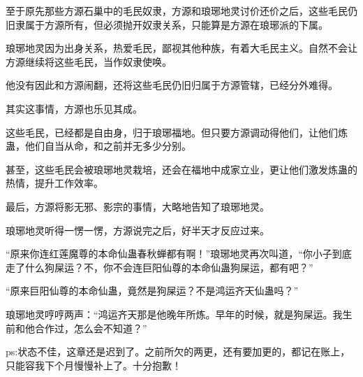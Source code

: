 \begin{this_body}
至于原先那些方源石巢中的毛民奴隶，方源和琅琊地灵讨价还价之后，这些毛民仍旧隶属于方源所有，但必须抛开奴隶关系，只能算是方源在琅琊派的下属。

琅琊地灵因为出身关系，热爱毛民，鄙视其他种族，有着大毛民主义。自然不会让方源继续将这些毛民，当作奴隶使唤。

他没有因此和方源闹翻，还将这些毛民仍旧归属于方源管辖，已经分外难得。

其实这事情，方源也乐见其成。

这些毛民，已经都是自由身，归于琅琊福地。但只要方源调动得他们，让他们炼蛊，他们自当从命，和之前并无多少分别。

甚至，这些毛民会被琅琊地灵栽培，还会在福地中成家立业，更让他们激发炼蛊的热情，提升工作效率。

最后，方源将影无邪、影宗的事情，大略地告知了琅琊地灵。

琅琊地灵听得一愣一愣，方源说完之后，好半天才反应过来。

“原来你连红莲魔尊的本命仙蛊春秋蝉都有啊！”琅琊地灵再次叫道，“你小子到底走了什么狗屎运？不，你不会连巨阳仙尊的本命仙蛊狗屎运，都有吧？”

“原来巨阳仙尊的本命仙蛊，竟然是狗屎运？不是鸿运齐天仙蛊吗？”

琅琊地灵哼哼两声：“鸿运齐天那是他晚年所炼。早年的时候，就是狗屎运。我生前和他合作过，怎么会不知道？”

ps:状态不佳，这章还是迟到了。之前所欠的两更，还有要加更的，都记在账上，只能容我下个月慢慢补上了。十分抱歉！

\end{this_body}

